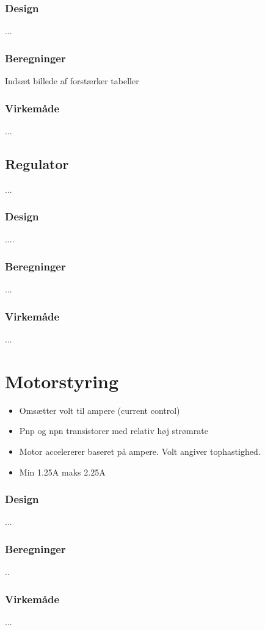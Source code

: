 \subsubsection{Design}
...

\subsubsection{Beregninger}

Indsæt billede af forstærker tabeller

\subsubsection{Virkemåde}
... 

\subsection{Regulator}
...

\subsubsection{Design}

....

\subsubsection{Beregninger}

...

\subsubsection{Virkemåde}

...
\section{Motorstyring}\label{sec:sec_motorstyring}

\begin{itemize}
	\item Omsætter volt til ampere (current control)
	\item Pnp og npn transistorer med relativ høj strømrate
	\item Motor accelererer baseret på ampere. Volt angiver tophastighed.
	\item Min 1.25A maks 2.25A
\end{itemize}

\subsubsection{Design}
...

\subsubsection{Beregninger}
..

\subsubsection{Virkemåde}
...